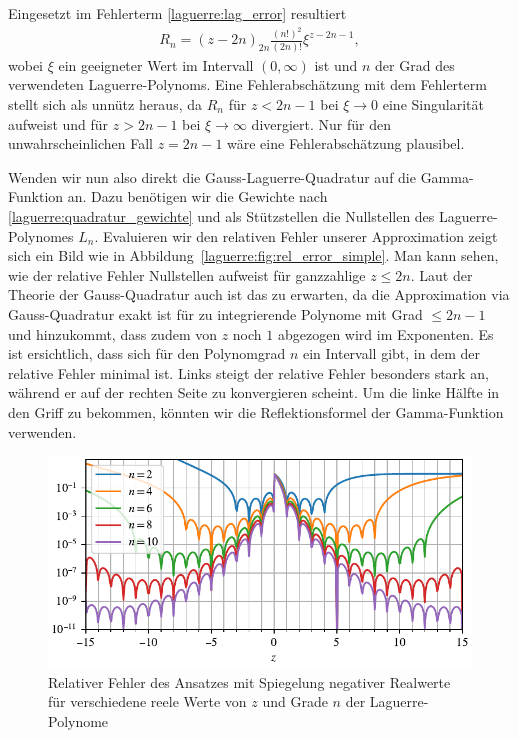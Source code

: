 Eingesetzt im Fehlerterm \eqref{laguerre:lag_error} resultiert
\begin{align}
R_n
=
(z - 2n)_{2n} \frac{(n!)^2}{(2n)!} \xi^{z-2n-1}
,
\label{laguerre:gamma_err_simple}
\end{align}
wobei $\xi$ ein geeigneter Wert im Intervall $(0, \infty)$ ist
und $n$ der Grad des verwendeten Laguerre-Polynoms.
Eine Fehlerabschätzung mit dem Fehlerterm stellt sich als unnütz heraus,
da $R_n$ für $z < 2n - 1$ bei $\xi \rightarrow 0$ eine Singularität aufweist
und für $z > 2n - 1$ bei $\xi \rightarrow \infty$ divergiert.
Nur für den unwahrscheinlichen Fall $ z = 2n - 1$
wäre eine Fehlerabschätzung plausibel.

Wenden wir nun also direkt die Gauss-Laguerre-Quadratur auf die Gamma-Funktion
an.
Dazu benötigen wir die Gewichte nach
\eqref{laguerre:quadratur_gewichte}
und als Stützstellen die Nullstellen des Laguerre-Polynomes $L_n$.
Evaluieren wir den relativen Fehler unserer Approximation zeigt sich ein
Bild wie in Abbildung~\ref{laguerre:fig:rel_error_simple}.
Man kann sehen,
wie der relative Fehler Nullstellen aufweist für ganzzahlige $z \leq 2n$.
Laut der Theorie der Gauss-Quadratur auch ist das zu erwarten,
da die Approximation via Gauss-Quadratur
exakt ist für zu integrierende Polynome mit Grad $\leq 2n-1$
und hinzukommt,
dass zudem von $z$ noch $1$ abgezogen wird im Exponenten.
Es ist ersichtlich,
dass sich für den Polynomgrad $n$ ein Intervall gibt,
in dem der relative Fehler minimal ist.
Links steigt der relative Fehler besonders stark an,
während er auf der rechten Seite zu konvergieren scheint.
Um die linke Hälfte in den Griff zu bekommen,
könnten wir die Reflektionsformel der Gamma-Funktion verwenden.

\begin{figure}
\centering
% 
\includegraphics{papers/laguerre/images/rel_error_mirror.pdf}
\caption{Relativer Fehler des Ansatzes mit Spiegelung negativer Realwerte
für verschiedene reele Werte von $z$ und Grade $n$ der Laguerre-Polynome}
\label{laguerre:fig:rel_error_mirror}
\end{figure}

